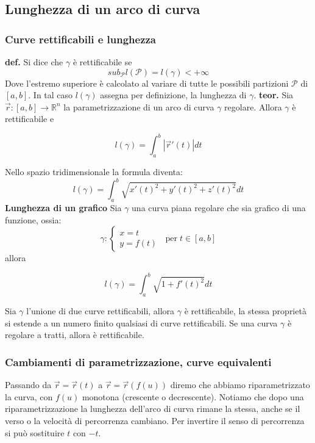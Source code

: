 \subsection{Lunghezza di un arco di curva}
\subsubsection{Curve rettificabili e lunghezza}
\textbf{def.} Si dice che $\gamma$ è rettificabile se 
\[
    sub_\mathcal{P} l(\mathcal{P}) = l(\gamma) < + \infty
\]
Dove l'estremo superiore è calcolato al variare di tutte le possibili partizioni $\mathcal{P}$ di $[a,b]$.\newline
In tal caso $l(\gamma)$ assegna per definizione, la lunghezza di $\gamma$.\newline
\newline
\textbf{teor.} Sia $\vec{r}:[a,b] \rightarrow \mathbb{R}^n$ la parametrizzazione di un arco di curva $\gamma$ regolare. Allora $\gamma$ è rettificabile e 
\begin{tcolorbox}
\[
    l(\gamma) = \int_{a}^{b}|\vec{r}'(t)| dt
\]
\end{tcolorbox}
Nello spazio tridimensionale la formula diventa:
\[
    l(\gamma)= \int_{a}^{b}\sqrt{x'(t)^2 + y'(t)^2 + z'(t)^2}dt
\]
\textbf{Lunghezza di un grafico}\newline
Sia $\gamma$ una curva piana regolare che sia grafico di una funzione, ossia:
\[
    \gamma : \begin{cases}
        x =t \\
        y= f(t)
    \end{cases} \;\; \text{per} \;t \in[a,b]
\]
allora
\begin{tcolorbox}
\[
    l(\gamma) = \int_{a}^{b}\sqrt{1+f'(t)^2}dt
\]
\end{tcolorbox}
Sia $\gamma$ l'unione di due curve rettificabili, allora $\gamma$ è rettificabile, la stessa proprietà si estende a un numero finito qualsiasi di curve rettificabili. \newline
\newline
Se una curva $\gamma$ è regolare a tratti, allora è rettificabile.\newline
\subsubsection{Cambiamenti di parametrizzazione, curve equivalenti}
Passando da $\vec{r} = \vec{r} (t)$ a $\vec{r} = \vec{r} (f(u))$ diremo che abbiamo riparametrizzato la curva, con $f(u)$ monotona (crescente o decrescente).\newline
Notiamo che dopo una riparametrizzazione la lunghezza dell'arco di curva rimane la stessa, anche se il verso o la velocità di percorrenza cambiano.\newline
Per invertire il senso di percorrenza si può sostituire $t$ con $-t$.\newline
